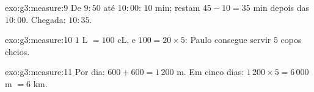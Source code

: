 \begin{solution}{exo:g3:measure:9}
De $9{:}50$ até $10{:}00$: $10$ min; restam $45 - 10 = 35$ min
depois das $10{:}00$. Chegada: $10{:}35$.
\end{solution}

\begin{solution}{exo:g3:measure:10}
$1$ L $= 100$ cL, e $100 = 20 \times 5$: Paulo consegue servir $5$
copos cheios.
\end{solution}

\begin{solution}{exo:g3:measure:11}
Por dia: $600 + 600 = 1\,200$ m. Em cinco dias:
$1\,200 \times 5 = 6\,000$ m $= 6$ km.
\end{solution}
